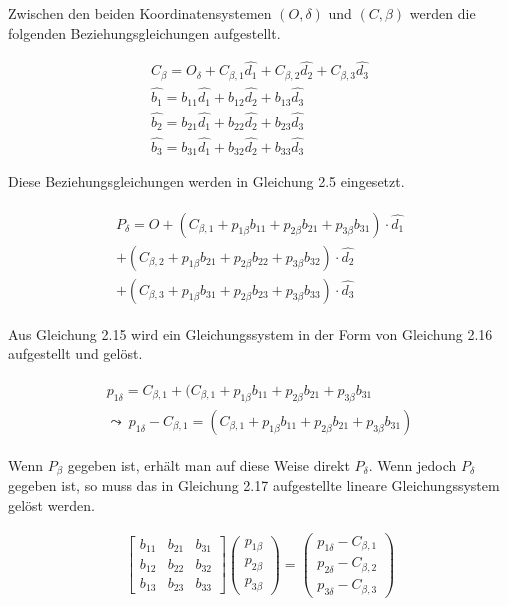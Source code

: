 	Zwischen den beiden Koordinatensystemen	$(O,\delta)$  und $(C,\beta)$ werden die folgenden Beziehungsgleichungen aufgestellt. 

\begin{gather}
	C_\beta = O_\delta + C_{\beta,1}\hat{d_1} +C_{\beta,2}\hat{d_2} + C_{\beta,3}\hat{d_3}\\
	\hat{b_1} = b_{11}\hat{d_1} +  b_{12}\hat{d_2} +  b_{13}\hat{d_3}\\
	\hat{b_2} = b_{21}\hat{d_1} +  b_{22}\hat{d_2} +  b_{23}\hat{d_3}\\
	\hat{b_3} = b_{31}\hat{d_1} +  b_{32}\hat{d_2} +  b_{33}\hat{d_3}
\end{gather}

Diese Beziehungsgleichungen werden in Gleichung 2.5 eingesetzt.

\begin{gather}
	\begin{split}
		P_\delta = O + (C_{\beta,1} + p_{1\beta}b_{11} +  p_{2\beta}b_{21} + p_{3\beta}b_{31}) \cdot \hat{d_1}\\
		+(C_{\beta,2} + p_{1\beta}b_{21} +  p_{2\beta}b_{22} + p_{3\beta}b_{32} )\cdot \hat{d_2}\\
		+ (C_{\beta,3} + p_{1\beta}b_{31} +  p_{2\beta}b_{23} + p_{3\beta}b_{33} )\cdot \hat{d_3}
	\end{split}
\end{gather}

Aus Gleichung 2.15 wird ein Gleichungssystem in der Form von Gleichung 2.16 aufgestellt und gelöst.

\begin{gather}
	\begin{split}
		p_{1\delta} = C_{\beta,1} + (C_{\beta,1} + p_{1\beta}b_{11} +  p_{2\beta}b_{21} + p_{3\beta}b_{31} \\
		\leadsto \: p_{1\delta} - C_{\beta,1} =  (C_{\beta,1} + p_{1\beta}b_{11} +  p_{2\beta}b_{21} + p_{3\beta}b_{31})
	\end{split}
\end{gather}

Wenn $P_\beta$ gegeben ist, erhält man auf diese Weise direkt $P_\delta$. Wenn jedoch  $P_\delta$  gegeben ist, so muss das in Gleichung 2.17 aufgestellte lineare Gleichungssystem gelöst werden.

\begin{gather}
	\begin{bmatrix}b_{11} & b_{21} & b_{31}\\
		b_{12} & b_{22} & b_{32}\\
		b_{13} & b_{23} & b_{33}
	\end{bmatrix} 
	\begin{pmatrix}
		p_{1\beta}\\p_{2\beta}\\ p_{3\beta}
	\end{pmatrix} = 
	\begin{pmatrix}
		p_{1\delta} - C_{\beta,1}\\
		p_{2\delta} - C_{\beta,2}\\
		p_{3\delta} - C_{\beta,3}
	\end{pmatrix}
\end{gather}

